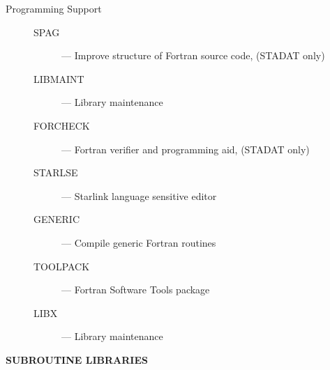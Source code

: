 \begin{description}
\item [Programming Support] \mbox{}
\begin{description}
\item [SPAG] --- Improve structure of Fortran source code, (STADAT only)
\item [LIBMAINT] --- Library maintenance
\item [FORCHECK] --- Fortran verifier and programming aid, (STADAT only)
\item [STARLSE] --- Starlink language sensitive editor
\item [GENERIC] --- Compile generic Fortran routines
\item [TOOLPACK] --- Fortran Software Tools package
\item [LIBX] --- Library maintenance
\end{description}

\end{description}

\newpage

\begin{center}
{\bf\Large SUBROUTINE LIBRARIES}
\end{center}
\normalsize

